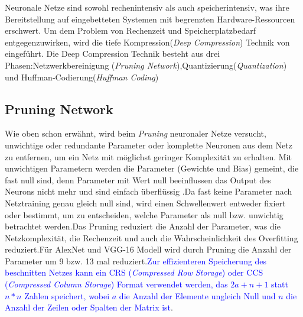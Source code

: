 \documentclass[12pt,a4paper]{scrartcl}
\numberwithin{equation}{section}
\begin{document}
  Neuronale Netze sind sowohl rechenintensiv als auch speicherintensiv, was ihre Bereitstellung auf eingebetteten Systemen mit begrenzten Hardware-Ressourcen erschwert\cite{5}. 
  Um dem Problem von Rechenzeit und Speicherplatzbedarf entgegenzuwirken, wird die tiefe Kompression(\textit{Deep Compression}) Technik von \cite[Han et al]{5} eingeführt.
  Die Deep Compression Technik besteht aus drei Phasen:Netzwerkbereinigung (\textit{Pruning Network}),Quantizierung(\textit{Quantization}) und Huffman-Codierung(\textit{Huffman Coding})
  
\subsection{Pruning Network}
Wie oben schon erwähnt, wird beim \textit{Pruning} neuronaler Netze versucht, unwichtige oder redundante Parameter oder komplette Neuronen aus dem Netz zu entfernen, um ein Netz mit möglichst geringer Komplexität zu erhalten. Mit unwichtigen Parametern werden die Parameter (Gewichte und Bias) gemeint, die fast null sind, denn Parameter mit Wert null beeinflussen das Output des Neurons nicht mehr und sind einfach überflüssig .Da fast keine Parameter nach Netztraining genau gleich null sind, wird einen Schwellenwert entweder fixiert oder bestimmt, um zu entscheiden, welche Parameter als null bzw. unwichtig betrachtet werden.Das Pruning reduziert die Anzahl der Parameter, was die Netzkomplexität, die Rechenzeit und auch die Wahrscheinlichkeit des Overfitting reduziert.Für AlexNet und VGG-16 Modell wird durch Pruning die Anzahl der Parameter um 9 bzw. 13 mal reduziert\cite{5}.\textcolor{blue}{Zur effizienteren Speicherung des beschnitten Netzes kann ein CRS (\textit{Compressed Row Storage}) oder CCS (\textit{Compressed Column Storage}) Format verwendet werden, das $ 2a+n+1 $ statt $ n*n $ Zahlen speichert, wobei $ a $ die Anzahl der Elemente ungleich Null und $ n $ die Anzahl der Zeilen oder Spalten der Matrix ist}. \\
\end{document}
